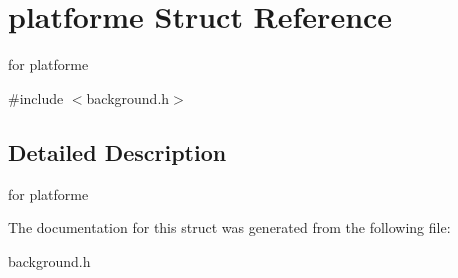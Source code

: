 \hypertarget{structplatforme}{}\section{platforme Struct Reference}
\label{structplatforme}


for platforme  




{\ttfamily \#include $<$background.\+h$>$}



\subsection{Detailed Description}
for platforme 

The documentation for this struct was generated from the following file\+:\begin{DoxyCompactItemize}
\item 
background.\+h\end{DoxyCompactItemize}
